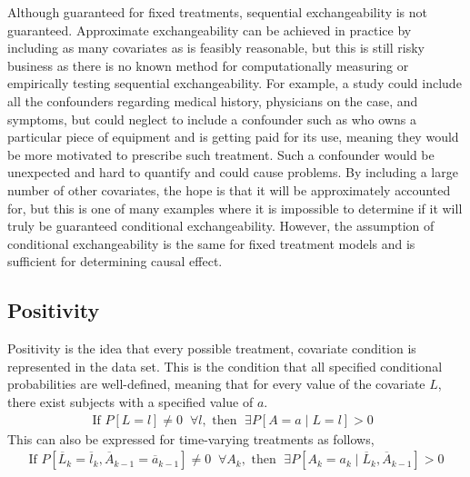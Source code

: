Although guaranteed for fixed treatments, sequential exchangeability is not guaranteed.\cite{wright2015international}  Approximate exchangeability can be achieved in practice by including as many covariates as is feasibly reasonable, but this is still risky business as there is no known method for computationally measuring or empirically testing sequential exchangeability.  For example, a study could include all the confounders regarding medical history, physicians on the case, and symptoms, but could neglect to include a confounder such as who owns a particular piece of equipment and is getting paid for its use, meaning they would be more motivated to prescribe such treatment.  Such a confounder would be unexpected and hard to quantify and could cause problems.  By including a large number of other covariates, the hope is that it will be approximately accounted for, but this is one of many examples where it is impossible to determine if it will truly be guaranteed conditional exchangeability.  However, the assumption of conditional exchangeability is the same for fixed treatment models and is sufficient for determining causal effect. 


      
\subsection{Positivity} 
Positivity is the idea that every possible treatment, covariate condition is represented in the data set.  This is the condition that all specified conditional probabilities are well-defined, meaning that for every value of the covariate $L$, there exist subjects with a specified value of $a$.\cite{hernan2006estimating} 
\begin{align}
\text{If }P[L=l] \neq 0 \; \; \forall l, \text{ then } \;  \exists P[A=a \mid L=l] > 0 \;\;  
\end{align} 
This can also be expressed for time-varying treatments as follows, 
\begin{align} 
\text{If } P[\overline{L}_k = \overline{l}_k, \overline{A}_{k-1} = \overline{a}_{k-1} ] \neq 0 \; \; \forall A_k, \text{ then }  \; \exists P[A_k = a_k \mid \overline{L}_{k}, \overline{A}_{k-1}] > 0 
\end{align} 




